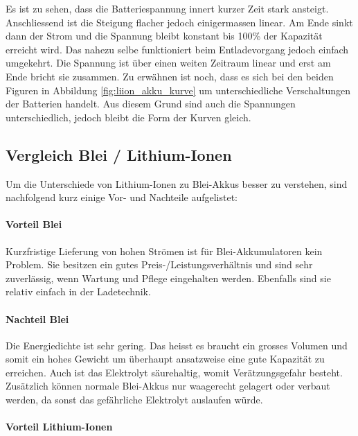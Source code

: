 Es ist zu sehen, dass die Batteriespannung innert kurzer Zeit stark ansteigt. Anschliessend ist die Steigung flacher jedoch einigermassen linear. Am Ende sinkt dann der Strom und die Spannung bleibt konstant bis 100\% der Kapazität erreicht wird.
Das nahezu selbe funktioniert beim Entladevorgang jedoch einfach umgekehrt. Die Spannung ist über einen weiten Zeitraum linear und erst am Ende bricht sie zusammen.
Zu erwähnen ist noch, dass es sich bei den beiden Figuren in Abbildung \ref{fig:liion_akku_kurve} um unterschiedliche Verschaltungen der Batterien handelt. Aus diesem Grund sind auch die Spannungen unterschiedlich, jedoch bleibt die Form der Kurven gleich.

\newpage

\subsection{Vergleich Blei / Lithium-Ionen} \label{kap:Vergleich_liion_pb}

Um die Unterschiede von Lithium-Ionen zu Blei-Akkus besser zu verstehen, sind nachfolgend kurz einige Vor- und Nachteile aufgelistet:

\paragraph{Vorteil Blei}

Kurzfristige Lieferung von hohen Strömen ist für Blei-Akkumulatoren kein Problem. Sie besitzen ein gutes Preis-/Leistungsverhältnis und sind sehr zuverlässig, wenn Wartung und Pflege eingehalten werden. Ebenfalls sind sie relativ einfach in der Ladetechnik.

\paragraph{Nachteil Blei}

Die Energiedichte ist sehr gering. Das heisst es braucht ein grosses Volumen und somit ein hohes Gewicht um überhaupt ansatzweise eine gute Kapazität zu erreichen. Auch ist das Elektrolyt säurehaltig, womit Verätzungsgefahr besteht. Zusätzlich können normale Blei-Akkus nur waagerecht gelagert oder verbaut werden, da sonst das gefährliche Elektrolyt auslaufen würde.

\paragraph{Vorteil Lithium-Ionen}

